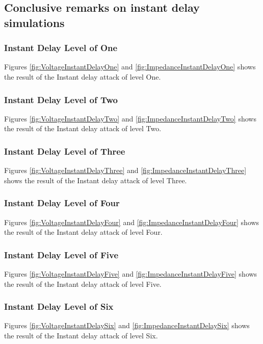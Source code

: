 \newpage
\subsection{Conclusive remarks on instant delay simulations}


\subsubsection{Instant Delay Level of One}
Figures \ref{fig:VoltageInstantDelayOne} and \ref{fig:ImpedanceInstantDelayOne} shows the result of the Instant delay attack of level One. 

\subsubsection{Instant Delay Level of Two}
Figures \ref{fig:VoltageInstantDelayTwo} and \ref{fig:ImpedanceInstantDelayTwo} shows the result of the Instant delay attack of level Two. 

\subsubsection{Instant Delay Level of Three}
Figures \ref{fig:VoltageInstantDelayThree} and \ref{fig:ImpedanceInstantDelayThree} shows the result of the Instant delay attack of level Three. 

\subsubsection{Instant Delay Level of Four}
Figures \ref{fig:VoltageInstantDelayFour} and \ref{fig:ImpedanceInstantDelayFour} shows the result of the Instant delay attack of level Four. 

\subsubsection{Instant Delay Level of Five}
Figures \ref{fig:VoltageInstantDelayFive} and \ref{fig:ImpedanceInstantDelayFive} shows the result of the Instant delay attack of level Five. 

\subsubsection{Instant Delay Level of Six}
Figures \ref{fig:VoltageInstantDelaySix} and \ref{fig:ImpedanceInstantDelaySix} shows the result of the Instant delay attack of level Six. 








